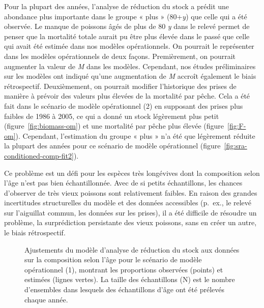 \documentclass[french,11pt]{book}
\begin{document}
Pour la plupart des années, l'analyse de réduction du stock a prédit une abondance plus importante dans le groupe « plus » (80+\emph{y}) que celle qui a été observée. Le manque de poissons âgés de plus de 80 \emph{y} dans le relevé permet de penser que la mortalité totale aurait pu être plus élevée dans le passé que celle qui avait été estimée dans nos modèles opérationnels. On pourrait le représenter dans les modèles opérationnels de deux façons. Premièrement, on pourrait augmenter la valeur de \emph{M} dans les modèles. Cependant, nos études préliminaires sur les modèles ont indiqué qu'une augmentation de \emph{M} accroît également le biais rétrospectif. Deuxièmement, on pourrait modifier l'historique des prises de manière à prévoir des valeurs plus élevées de la mortalité par pêche. Cela a été fait dans le scénario de modèle opérationnel (2) en supposant des prises plus faibles de 1986 à 2005, ce qui a donné un stock légèrement plus petit (figure~\ref{fig:biomass-om}) et une mortalité par pêche plus élevée (figure~\ref{fig:F-om}). Cependant, l'estimation du groupe « plus » n'a été que légèrement réduite la plupart des années pour ce scénario de modèle opérationnel (figure~\ref{fig:sra-conditioned-comp-fit2}).

Ce problème est un défi pour les espèces très longévives dont la composition selon l'âge n'est pas bien échantillonnée. Avec de si petits échantillons, les chances d'observer de très vieux poissons sont relativement faibles. En raison des grandes incertitudes structurelles du modèle et des données accessibles (p.~ex., le relevé sur l'aiguillat commun, les données sur les prises), il a été difficile de résoudre un problème, la surprédiction persistante des vieux poissons, sans en créer un autre, le biais rétrospectif.

\clearpage


\begin{figure}[htb]

{\centering {} 

}

\caption{Ajustements du modèle d'analyse de réduction du stock aux données sur la composition selon l'âge pour le scénario de modèle opérationnel (1), montrant les proportions observées (points) et estimées (lignes vertes). La taille des échantillons (N) est le nombre d'ensembles dans lesquels des échantillons d'âge ont été prélevés chaque année.}\label{fig:sra-conditioned-comp-fit1}
\end{figure}
\clearpage
\end{document}
